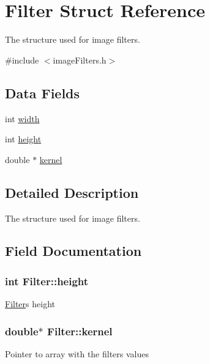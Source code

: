\hypertarget{struct_filter}{}\section{Filter Struct Reference}
\label{struct_filter}


The structure used for image filters.  




{\ttfamily \#include $<$image\+Filters.\+h$>$}

\subsection*{Data Fields}
\begin{DoxyCompactItemize}
\item 
int \hyperlink{struct_filter_a4cc9de0bbbb278889fec030c16078ba3}{width}
\item 
int \hyperlink{struct_filter_a84dc0a1a8114ae3bb64a7c4e07626b22}{height}
\item 
double $\ast$ \hyperlink{struct_filter_a3a4c7f287be386887879bed75f9ccad2}{kernel}
\end{DoxyCompactItemize}


\subsection{Detailed Description}
The structure used for image filters. 

\subsection{Field Documentation}
\hypertarget{struct_filter_a84dc0a1a8114ae3bb64a7c4e07626b22}{}
\subsubsection[{height}]{\setlength{\rightskip}{0pt plus 5cm}int Filter\+::height}\label{struct_filter_a84dc0a1a8114ae3bb64a7c4e07626b22}
\hyperlink{struct_filter}{Filter}\textquotesingle{}s height \hypertarget{struct_filter_a3a4c7f287be386887879bed75f9ccad2}{}
\subsubsection[{kernel}]{\setlength{\rightskip}{0pt plus 5cm}double$\ast$ Filter\+::kernel}\label{struct_filter_a3a4c7f287be386887879bed75f9ccad2}
Pointer to array with the filter\textquotesingle{}s values \hypertarget{struct_filter_a4cc9de0bbbb278889fec030c16078ba3}{}
